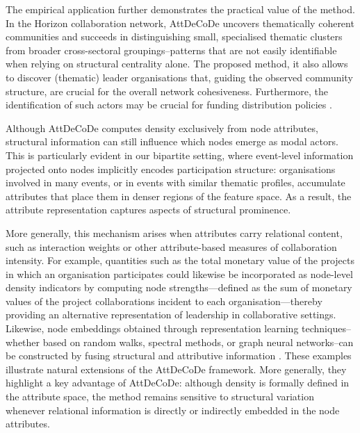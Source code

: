 \documentclass[11pt]{article}
\begin{document}
The empirical application further demonstrates the practical value of the method. In the Horizon collaboration network, AttDeCoDe uncovers thematically coherent communities and succeeds in distinguishing small, specialised thematic clusters from broader cross-sectoral groupings--patterns that are not easily identifiable when relying on structural centrality alone. The proposed method, it also allows to discover (thematic) leader organisations that, guiding the observed community structure, are crucial for the overall network cohesiveness. Furthermore, the identification of such actors may be crucial for funding distribution policies \citep{Morea2024MappingAnalysis}. %

Although AttDeCoDe computes density exclusively from node attributes, structural information can still influence which nodes emerge as modal actors. This is particularly evident in our bipartite setting, where event-level information projected onto nodes implicitly encodes participation structure: organisations involved in many events, or in events with similar thematic profiles, accumulate attributes that place them in denser regions of the feature space. As a result, the attribute representation captures aspects of structural prominence.

More generally, this mechanism arises when attributes carry relational content, such as interaction weights or other attribute-based measures of collaboration intensity. For example, quantities such as the total monetary value of the projects in which an organisation participates \citep{Morea2024MappingAnalysis} could likewise be incorporated as node-level density indicators by computing node strengths—defined as the sum of monetary values of the project collaborations incident to each organisation—thereby providing an alternative representation of leadership in collaborative settings. Likewise, node embeddings obtained through representation learning techniques--whether based on random walks, spectral methods, or graph neural networks--can be constructed by fusing structural and attributive information \citep{cai2018, cui2018}. 
These examples illustrate natural extensions of the AttDeCoDe framework. More generally, they highlight a key advantage of AttDeCoDe: although density is formally defined in the attribute space, the method remains sensitive to structural variation whenever relational information is directly or indirectly embedded in the node attributes.
\end{document}
